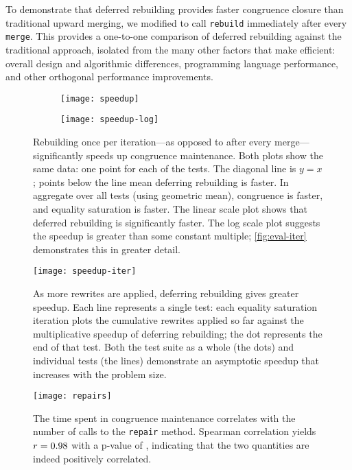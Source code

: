 To demonstrate that deferred rebuilding
  provides faster congruence closure than traditional upward merging,
  we modified \egg to call \texttt{rebuild} immediately after every \texttt{merge}.
This provides a one-to-one comparison of deferred rebuilding against the
  traditional approach, isolated
  from the many other factors that make \egg efficient: overall design
  and algorithmic differences, programming language performance, and other
  orthogonal performance improvements.

\begin{figure}
  \begin{subfigure}{0.49\linewidth}
    \texttt{[image: speedup]}
  \end{subfigure}
  \hfill
  \begin{subfigure}{0.49\linewidth}
    \texttt{[image: speedup-log]}
  \end{subfigure}
  \caption{
    Rebuilding once per iteration---as opposed to after every merge---significantly
      speeds up congruence maintenance.
    Both plots show the same data: one point for each of the \nEggTests tests.
    The diagonal line is $y=x$;
      points below the line mean deferring rebuilding is faster.
    In aggregate over all tests (using geometric mean),
      congruence is \CongrSpeedup faster, and
      equality saturation is \TotalSpeedup faster.
    The linear scale plot shows that deferred rebuilding is significantly faster.
    The log scale plot suggests the speedup is greater than some constant multiple;
      \autoref{fig:eval-iter} demonstrates this in greater detail.
  }
  \label{fig:eval}

  \begin{minipage}[t]{0.48\linewidth}
  \texttt{[image: speedup-iter]}
  \caption{
    As more rewrites are applied, deferring rebuilding gives greater speedup.
    Each line represents a single test: each equality saturation iteration plots
      the cumulative rewrites applied so far against the multiplicative speedup
      of deferring rebuilding; the dot represents the end of that test.
    Both the test suite as a whole (the dots) and individual tests (the lines)
      demonstrate an asymptotic speedup that increases with
      the problem size.
  }
  \label{fig:eval-iter}
  \end{minipage}
  \hfill
  \begin{minipage}[t]{0.48\linewidth}
  \texttt{[image: repairs]}
  \caption{
    The time spent in congruence maintenance correlates with the number of calls
    to the \texttt{repair} method.
    Spearman correlation yields $r=0.98$ with a p-value of \RepairsP,
    indicating that the two quantities are indeed positively correlated.
  }
  \label{fig:repair-plot}
  \end{minipage}
\end{figure}


